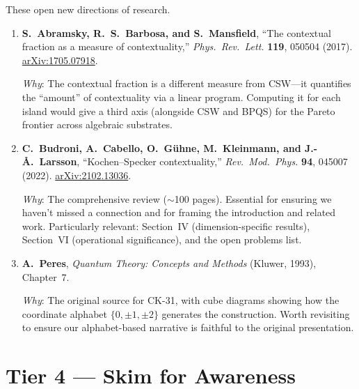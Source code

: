 \documentclass[11pt,a4paper]{article}
\begin{document}
These open new directions of research.

\begin{enumerate}[label=\textbf{\arabic*.}, leftmargin=2em, start=8]

\item \textbf{S.~Abramsky, R.~S.~Barbosa, and S.~Mansfield},
``The contextual fraction as a measure of contextuality,''
\textit{Phys.\ Rev.\ Lett.} \textbf{119}, 050504 (2017).
\href{https://arxiv.org/abs/1705.07918}{arXiv:1705.07918}.

\smallskip\noindent
\textit{Why}: The contextual fraction is a different measure from CSW---it quantifies the ``amount'' of contextuality via a linear program.  Computing it for each island would give a third axis (alongside CSW and BPQS) for the Pareto frontier across algebraic substrates.

\bigskip

\item \textbf{C.~Budroni, A.~Cabello, O.~G\"uhne, M.~Kleinmann, and J.-\AA.~Larsson},
``Kochen--Specker contextuality,''
\textit{Rev.\ Mod.\ Phys.} \textbf{94}, 045007 (2022).
\href{https://arxiv.org/abs/2102.13036}{arXiv:2102.13036}.

\smallskip\noindent
\textit{Why}: The comprehensive review ($\sim$100 pages).  Essential for ensuring we haven't missed a connection and for framing the introduction and related work.  Particularly relevant: Section~IV (dimension-specific results), Section~VI (operational significance), and the open problems list.

\bigskip

\item \textbf{A.~Peres},
\textit{Quantum Theory: Concepts and Methods} (Kluwer, 1993), Chapter~7.

\smallskip\noindent
\textit{Why}: The original source for CK-31, with cube diagrams showing how the coordinate alphabet $\{0, \pm 1, \pm 2\}$ generates the construction.  Worth revisiting to ensure our alphabet-based narrative is faithful to the original presentation.

\end{enumerate}

\bigskip

\section*{\textcolor{tier4}{Tier 4 --- Skim for Awareness}}
\end{document}
